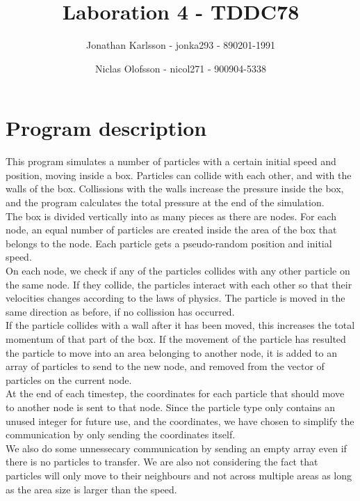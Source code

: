 \documentclass[a4paper]{article}
\author{Jonathan Karlsson - jonka293 - 890201-1991 \and Niclas Olofsson - nicol271 - 900904-5338}
\title{Laboration 4 - TDDC78}
\begin{document}
\maketitle

\section{Program description}
This program simulates a number of particles with a certain initial
speed and position, moving inside a box. Particles can collide with each
other, and with the walls of the box. Collissions with the walls increase
the pressure inside the box, and the program calculates the total pressure
at the end of the simulation.\\

The box is divided vertically into as many pieces as there are nodes.
For each node, an equal number of particles are created inside the area
of the box that belongs to the node. Each particle gets a pseudo-random
position and initial speed.\\

On each node, we check if any of the particles collides with any other
particle on the same node. If they collide, the particles interact with
each other so that their velocities changes according to the laws of
physics. The particle is moved in the same direction as before, if no
collission has occurred.\\

If the particle collides with a wall after it has been moved, this
increases the total momentum of that part of the box. If the movement
of the particle has resulted the particle to move into an area belonging
to another node, it is added to an array of particles to send to the new
node, and removed from the vector of particles on the current node.\\

At the end of each timestep, the coordinates for each particle that
should move to another node is sent to that node. Since the particle
type only contains an unused integer for future use, and the
coordinates, we have chosen to simplify the communication by only
sending the coordinates itself.\\

We also do some unnessecary communication by sending an empty array even
if there is no particles to transfer. We are also not considering the
fact that particles will only move to their neighbours and not across
multiple areas as long as the area size is larger than the speed.\\
\end{document}
